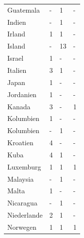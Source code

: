\documentclass[a4paper,
fontsize=11pt,
oneside,
numbers=noperiodatend,
parskip=half-,
bibliography=totoc,
final
]{scrartcl}
\begin{document}
\begin{longtable}{llll}
Guatemala                 & -                    & 1                    & -                    \\
Indien                    & -                    & 1                    & -                    \\
Irland                    & 1                    & 1                    & -                    \\
Island                    & -                    & 13                   & -                    \\
Israel                    & 1                    & -                    & -                    \\
Italien                   & 3                    & 1                    & -                    \\
Japan                     & 1                    & -                    & -                    \\
Jordanien                 & 1                    & -                    & -                    \\
Kanada                    & 3                    & -                    & 1                    \\
Kolumbien                 & 1                    & -                    & -                    \\
Kolumbien                 & -                    & 1                    & -                    \\
Kroatien                  & 4                    & -                    & -                    \\
Kuba                      & 4                    & 1                    & -                    \\
Luxemburg                 & 1                    & 1                    & 1                    \\
Malaysia                  & -                    & 1                    & -                    \\
Malta                     & 1                    & -                    & -                    \\
Nicaragua                 & -                    & 1                    & -                    \\
Niederlande               & 2                    & 1                    & -                    \\
Norwegen                  & 1                    & 1                    & 1                    \\

\end{longtable}
\end{document}
